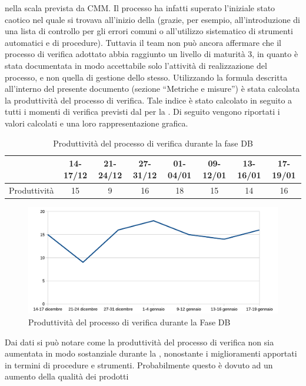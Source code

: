 				nella scala prevista da CMM. Il processo ha infatti superato l'iniziale stato caotico nel quale si trovava all'inizio della 
				(grazie, per esempio, all'introduzione di una lista di controllo per gli errori comuni o all'utilizzo sistematico di strumenti 
				automatici e di procedure). Tuttavia il team non può ancora affermare che il processo di verifica adottato abbia raggiunto un livello di 
				maturità 3, in quanto è stata documentata in modo accettabile solo l'attività di realizzazione del processo, e non quella di gestione 
				dello stesso.
				Utilizzando la formula descritta all'interno del presente documento (sezione “Metriche e misure”) è stata calcolata la produttività del 
				processo di verifica. Tale indice è stato calcolato in seguito a tutti i momenti di verifica previsti dal  per 
				la . Di seguito vengono riportati i valori calcolati e una loro rappresentazione grafica.
				\begin{table}[H]
					\centering
						\begin{tabu}{| l | c | c | c | c | c | c | c |}
							\hline
								&14-17/12	&21-24/12	&27-31/12 	&01-04/01	&09-12/01	&13-16/01	&17-19/01	\\ \hline
							Produttività	&15	&9	&16	&18	&15	&14	&16\\ \hline
						\end{tabu}
					\caption{Produttività del processo di verifica durante la fase DB}
				\end{table}
				\begin{figure}[H]
					\centering
					\includegraphics[width=12cm]{PianoDiQualifica/Pics/ProduttivitaVerificaFaseA.pdf}
					\caption{Produttività del processo di verifica durante la Fase DB}
				\end{figure}
				Dai dati si può notare come la produttività del processo di verifica non sia aumentata in modo sostanziale durante la , nonostante 
				i miglioramenti apportati in termini di procedure e strumenti. Probabilmente questo è dovuto ad un aumento della qualità dei prodotti 
